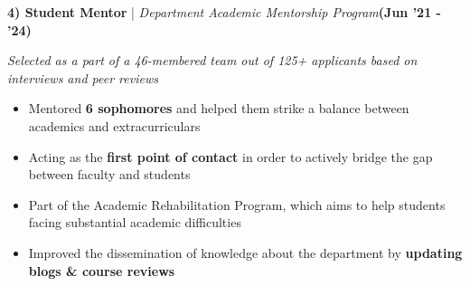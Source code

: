 \documentclass[10pt,letterpaper,sans]{moderncv}        %
\newcommand\x{1}
\newcommand\y{4}
\begin{document}
\hrulefill{}
\vspace{\y pt}




\textbf{4) Student Mentor} | \emph{Department Academic Mentorship Program}\hfill{\textbf{(Jun '21 - '24)}}

\textcolor{mygray}{\textit{Selected as a part of a 46-membered team out of 125+ applicants based on interviews and peer reviews}}

\vspace{\x pt}

\begin{itemize}
   \item Mentored \textbf{6 sophomores} and helped them strike a balance between academics and extracurriculars 
  \item Acting as the \textbf{first point of contact} in order to actively bridge the gap between faculty and students
  \item Part of the Academic Rehabilitation Program, which aims to help students facing substantial academic difficulties
  \item Improved the dissemination of knowledge about the department by \textbf{updating blogs \& course reviews}
\end{itemize}



\end{document}
